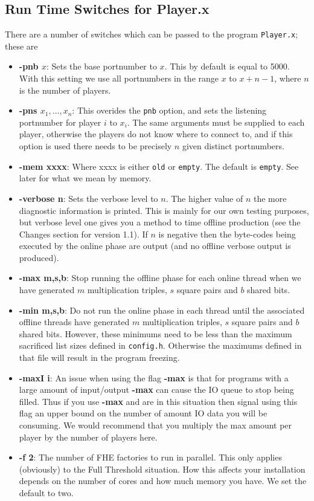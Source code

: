 \subsection{Run Time Switches for Player.x}
There are a number of switches which can be passed to the
program \verb+Player.x+; these are
\begin{itemize}
\item {\bf -pnb $x$}: Sets the base portnumber to $x$. This by
default is equal to 5000. With this setting we use all
portnumbers in the range $x$ to $x+n-1$,
where $n$ is the number of players. 
\item {\bf -pns $x_1,\ldots,x_n$}: This overides the \verb+pnb+
option, and sets the listening portnumber for player
$i$ to $x_i$.
The same arguments must be supplied to each player, otherwise
the players do not know where to connect to, and if this
option is used there needs to be precisely $n$ given
distinct portnumbers.
\item {\bf -mem xxxx}: Where xxxx is either \verb+old+
or \verb+empty+. The default is \verb+empty+.
See later for what we mean by memory.
\item {\bf -verbose n}: Sets the verbose level to $n$. The higher value
of $n$ the more diagnostic information is printed. This is mainly
for our own testing purposes, but verbose level one gives you a method
to time offline production (see the Changes section for version 1.1).
If $n$ is negative then the byte-codes being executed by the online
phase are output (and no offline verbose output is produced).
\item {\bf -max m,s,b}: Stop running the offline phase for each online
thread when we have generated $m$ multiplication triples, $s$ square
pairs and $b$ shared bits.
\item {\bf -min m,s,b}: Do not run the online phase in each thread 
until the associated offline threads have generated $m$ multiplication 
triples, $s$ square pairs and $b$ shared bits.
However, these minimums need to be less than the maximum sacrificed
list sizes defined in \verb+config.h+. Otherwise the maximums
defined in that file will result in the program freezing.
\item {\bf -maxI i}: An issue when using the flag {\bf -max} is that
for programs with a large amount of input/output {\bf -max} can cause the
IO queue to stop being filled.
Thus if you use {\bf -max} and are in this situation then signal
using this flag an upper bound on the number of amount IO data you
will be consuming. We would recommend that you multiply the max amount
per player by the number of players here.
\item {\bf -f 2}: The number of FHE factories to run in parallel.
This only applies (obviously) to the Full Threshold situation.
How this affects your installation depends on the number of cores
and how much memory you have. We set the default to two.
\end{itemize}
